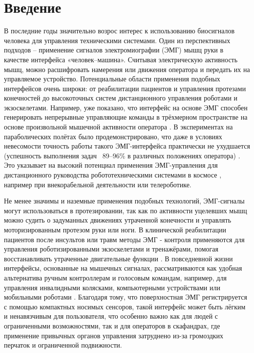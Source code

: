 \documentclass[12pt,a4paper]{article}
\begin{document}
\newpage

\section*{Введение}

В последние годы значительно возрос интерес к использованию биосигналов человека для управления техническими системами. Один из перспективных подходов -- применение сигналов электромиографии (ЭМГ) мышц руки в качестве интерфейса «человек--машина». Считывая электрическую активность мышц, можно расшифровать намерения или движения оператора и передать их на управляемое устройство. Потенциальные области применения подобных интерфейсов очень широки: от реабилитации пациентов и управления протезами конечностей до высокоточных систем дистанционного управления роботами и экзоскелетами. Например, уже показано, что интерфейс на основе ЭМГ способен генерировать непрерывные управляющие команды в трёхмерном пространстве на основе произвольной мышечной активности оператора \cite{1}. В экспериментах на параболических полётах было продемонстрировано, что даже в условиях невесомости точность работы такого ЭМГ-интерфейса практически не ухудшается (успешность выполнения задач ~89–96\% в различных положениях оператора) \cite{1, 2}. Это указывает на высокий потенциал применения ЭМГ-управления для дистанционного руководства робототехническими системами в космосе  
, например при внекорабельной деятельности или телероботике.

Не менее значимы и наземные применения подобных технологий, ЭМГ-сигналы могут использоваться в протезировании, так как по активности уцелевших мышц можно судить о задуманных движениях утраченной конечности и управлять моторизированным протезом руки или ноги. \cite{3,4} В клинической реабилитации пациентов после инсультов или травм методы ЭМГ - контроля применяются для управления роботизированными экзоскелетами и тренажёрами, помогая восстанавливать утраченные двигательные функции \cite{5}. В повседневной жизни интерфейсы, основанные на мышечных сигналах, рассматриваются как удобная альтернатива ручным контроллерам и голосовым командам, например, для управления инвалидными колясками, компьютерными устройствами или мобильными роботами \cite{6,7}.
Благодаря тому, что поверхностная ЭМГ регистрируется с помощью компактных носимых сенсоров, такой интерфейс может быть лёгким и ненавязчивым для пользователя, что особенно важно как для людей с ограниченными возможностями, так и для операторов в скафандрах, где применение привычных органов управления затруднено из-за громоздких перчаток и ограниченной подвижности.
\end{document}
